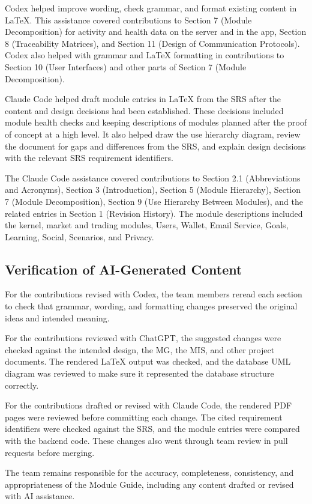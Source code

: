 \documentclass[12pt, titlepage]{article}
\begin{document}
\medskip\noindent
Codex helped improve wording, check grammar, and format existing content in LaTeX. This assistance covered contributions to Section 7 (Module Decomposition) for activity and health data on the server and in the app, Section 8 (Traceability Matrices), and Section 11 (Design of Communication Protocols). Codex also helped with grammar and LaTeX formatting in contributions to Section 10 (User Interfaces) and other parts of Section 7 (Module Decomposition). 

\medskip\noindent
Claude Code helped draft module entries in LaTeX from the SRS after the content and design decisions had been established. These decisions included module health checks and keeping descriptions of modules planned after the proof of concept at a high level. It also helped draw the use hierarchy diagram, review the document for gaps and differences from the SRS, and explain design decisions with the relevant SRS requirement identifiers. 

\medskip\noindent
The Claude Code assistance covered contributions to Section 2.1 (Abbreviations and Acronyms), Section 3 (Introduction), Section 5 (Module Hierarchy), Section 7 (Module Decomposition), Section 9 (Use Hierarchy Between Modules), and the related entries in Section 1 (Revision History). The module descriptions included the kernel, market and trading modules, Users, Wallet, Email Service, Goals, Learning, Social, Scenarios, and Privacy.

\subsection{Verification of AI-Generated Content}
For the contributions revised with Codex, the team members reread each section to check that grammar, wording, and formatting changes preserved the original ideas and intended meaning. 

\medskip\noindent
For the contributions reviewed with ChatGPT, the suggested changes were checked against the intended design, the MG, the MIS, and other project documents. The rendered LaTeX output was checked, and the database UML diagram was reviewed to make sure it represented the database structure correctly. 

\medskip\noindent
For the contributions drafted or revised with Claude Code, the rendered PDF pages were reviewed before committing each change. The cited requirement identifiers were checked against the SRS, and the module entries were compared with the backend code. These changes also went through team review in pull requests before merging. 

\medskip\noindent
The team remains responsible for the accuracy, completeness, consistency, and appropriateness of the Module Guide, including any content drafted or revised with AI assistance.
\end{document}
